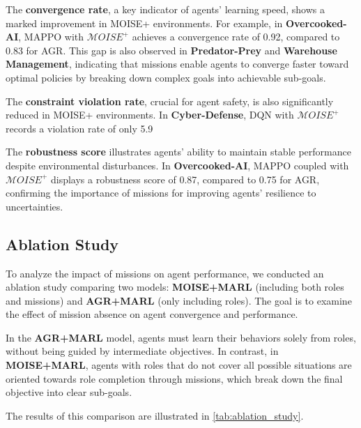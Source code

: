 \documentclass[sigconf,anonymous]{aamas}
\begin{document}
The \textbf{convergence rate}, a key indicator of agents' learning speed, shows a marked improvement in MOISE+ environments. For example, in \textbf{Overcooked-AI}, MAPPO with $\mathcal{M}OISE^+$ achieves a convergence rate of 0.92, compared to 0.83 for AGR. This gap is also observed in \textbf{Predator-Prey} and \textbf{Warehouse Management}, indicating that missions enable agents to converge faster toward optimal policies by breaking down complex goals into achievable sub-goals.

The \textbf{constraint violation rate}, crucial for agent safety, is also significantly reduced in MOISE+ environments. In \textbf{Cyber-Defense}, DQN with $\mathcal{M}OISE^+$ records a violation rate of only 5.9%

The \textbf{robustness score} illustrates agents' ability to maintain stable performance despite environmental disturbances. In \textbf{Overcooked-AI}, MAPPO coupled with $\mathcal{M}OISE^+$ displays a robustness score of 0.87, compared to 0.75 for AGR, confirming the importance of missions for improving agents' resilience to uncertainties.

\subsection{Ablation Study}

To analyze the impact of missions on agent performance, we conducted an ablation study comparing two models: \textbf{MOISE+MARL} (including both roles and missions) and \textbf{AGR+MARL} (only including roles). The goal is to examine the effect of mission absence on agent convergence and performance.

In the \textbf{AGR+MARL} model, agents must learn their behaviors solely from roles, without being guided by intermediate objectives. In contrast, in \textbf{MOISE+MARL}, agents with roles that do not cover all possible situations are oriented towards role completion through missions, which break down the final objective into clear sub-goals.

The results of this comparison are illustrated in \autoref{tab:ablation_study}.
\end{document}
